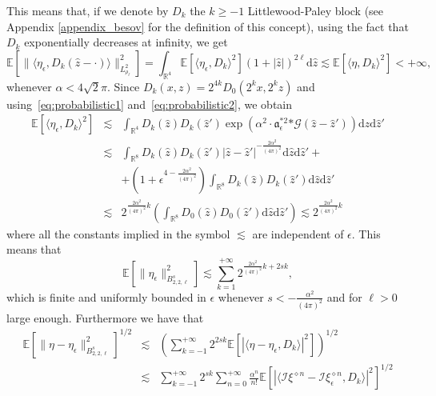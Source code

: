 \documentclass[a4paper,10pt]{article}
\newcommand{\asterisk}{\mathord{*}}
\newcommand{\mathd}{\mathrm{d}}
\begin{document}
This means that, if we denote by $D_k$ the $k \geqslant - 1$ Littlewood-Paley
block (see Appendix \ref{appendix_besov} for the definition of this concept),
using the fact that $D_k$ exponentially decreases at infinity, we get
\[ \mathbb{E} [\| \langle \eta_{\epsilon}, D_k (\hat{z} - \cdot) \rangle
   \|_{L^2_{\rho_{\ell}}}^2] = \int_{\mathbb{R}^4} \mathbb{E} [\langle
   \eta_{\epsilon}, D_k \rangle^2] (1 + | \hat{z} |)^{2 \ell} \mathd \hat{z}
   \lesssim \mathbb{E} [\langle \eta, D_k \rangle^2] < + \infty, \]
whenever $\alpha < 4 \sqrt{2} \pi$. Since $D_k (x, z) = 2^{4 k} D_0 (2^k x,
2^k z)$ and using~{\eqref{eq:probabilistic1}} and~{\eqref{eq:probabilistic2}},
we obtain
\begin{eqnarray}
  \mathbb{E} [\langle \eta_{\epsilon}, D_k \rangle^2] & \lesssim &
  \int_{\mathbb{R}^4} D_k (\hat{z}) D_k (\hat{z}') \exp (\alpha^2 \cdot
  \mathfrak{a}_{\epsilon}^{\asterisk 2} \asterisk \mathcal{G} (\hat{z} -
  \hat{z}')) \mathd \hat{z} \mathd \hat{z}' \nonumber\\
  & \lesssim & \int_{\mathbb{R}^8} D_k (\hat{z}) D_k (\hat{z}') | \hat{z} -
  \hat{z}' |^{- \frac{2 \alpha^2}{(4 \pi)^2}} \mathd \hat{z} \mathd \hat{z}' +
  \nonumber\\
  &  & + \left( 1 + \epsilon^{4 - \frac{2 \alpha^2}{(4 \pi)^2}} \right)
  \int_{\mathbb{R}^8} D_k (\hat{z}) D_k (\hat{z}') \mathd \hat{z} \mathd
  \hat{z}'  \nonumber\\
  & \lesssim & 2^{\frac{2 \alpha^2}{(4 \pi)^2} k} \left( \int_{\mathbb{R}^8}
  D_0 (\hat{z}) D_0 (\hat{z}') \mathd \hat{z} \mathd \hat{z}' \right) \lesssim
  2^{\frac{2 \alpha^2}{(4 \pi)^2} k} \nonumber
\end{eqnarray}
where all the constants implied in the symbol $\lesssim$ are independent of
$\epsilon$. This means that
\[ \mathbb{E} [\| \eta_{\epsilon} \|^2_{B^s_{2, 2, \ell}}] \lesssim \sum^{+
   \infty}_{k = 1} 2^{\frac{2 \alpha^2}{(4 \pi)^2} k + 2 s k}, \]
which is finite and uniformly bounded in $\epsilon$ whenever $s < -
\frac{\alpha^2}{(4 \pi)^2}$ and for $\ell > 0$ large enough. Furthermore we
have that
\begin{eqnarray}
  \mathbb{E} [\| \eta - \eta_{\epsilon} \|_{B^s_{2, 2, \ell}}^2]^{1 / 2} &
  \lesssim & \left( \sum_{k = - 1}^{+ \infty} 2^{2 s k} \mathbb{E}[| \langle
  \eta - \eta_{\epsilon}, D_k \rangle |^2] \right)^{1 / 2} \nonumber\\
  & \lesssim & \sum_{k = - 1}^{+ \infty} 2^{s k} \sum^{+ \infty}_{n = 0}
  \frac{\alpha^n}{n!} \mathbb{E} [| \langle \mathcal{I} \xi^{\diamond n} -
  \mathcal{I} \xi_{\epsilon}^{\diamond n}, D_k \rangle |^2]^{1 / 2} \nonumber
\end{eqnarray}
\end{document}
